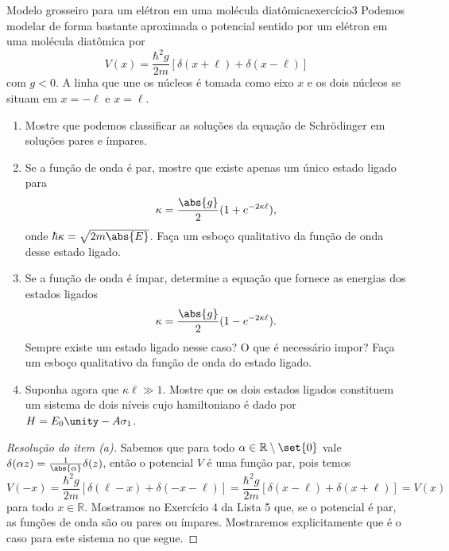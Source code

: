 \begin{exercício}{Modelo grosseiro para um elétron em uma molécula diatômica}{exercício3}
    Podemos modelar de forma bastante aproximada o potencial sentido por um elétron em uma molécula diatômica por
    \begin{equation*}
        V(x) = \frac{\hbar^2 g}{2m}\left[\delta(x + \ell) + \delta(x - \ell)\right]
    \end{equation*}
    com \(g < 0\). A linha que une os núcleos é tomada como eixo \(x\) e os dois núcleos se situam em \(x = -\ell\) e \(x = \ell\).
    \begin{enumerate}[label=(\alph*)]
        \item Mostre que podemos classificar as soluções da equação de Schrödinger em soluções pares e ímpares.
        \item Se a função de onda é par, mostre que existe apenas um único estado ligado para
            \begin{equation*}
                \kappa = \frac{\abs{g}}{2}(1 + e^{-2 \kappa \ell}),
            \end{equation*}
            onde \(\hbar \kappa = \sqrt{2 m \abs{E}}\). Faça um esboço qualitativo da função de onda desse estado ligado.
        \item Se a função de onda é ímpar, determine a equação que fornece as energias dos estados ligados
            \begin{equation*}
                \kappa = \frac{\abs{g}}{2}(1 - e^{-2 \kappa \ell}).
            \end{equation*}
            Sempre existe um estado ligado nesse caso? O que é necessário impor? Faça um esboço qualitativo da função de onda do estado ligado.
        \item Suponha agora que \(\kappa \ell \gg 1\). Mostre que os dois estados ligados constituem um sistema de dois níveis cujo hamiltoniano é dado por \(H = E_0 \unity - A \sigma_1\).
    \end{enumerate}
\end{exercício}
\begin{proof}[Resolução do item (a)]
    Sabemos que para todo \(\alpha \in \mathbb{R}\setminus\set{0}\) vale \(\delta(\alpha z) = \frac{1}{\abs{\alpha}} \delta(z)\), então o potencial \(V\) é uma função par, pois temos
    \begin{equation*}
        V(-x) = \frac{\hbar^2 g}{2m }\left[\delta(\ell - x) + \delta(-x - \ell)\right] = \frac{\hbar^2 g}{2m}\left[\delta(x - \ell) + \delta(x + \ell)\right] = V(x)
    \end{equation*}
    para todo \(x \in \mathbb{R}\). Mostramos no Exercício 4 da Lista 5 que, se o potencial é par, as funções de onda são ou pares ou ímpares. Mostraremos explicitamente que é o caso para este sistema no que segue.
\end{proof}
